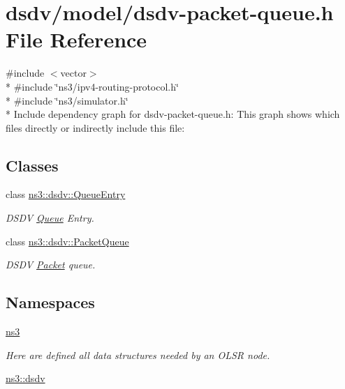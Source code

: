 \hypertarget{dsdv-packet-queue_8h}{}\section{dsdv/model/dsdv-\/packet-\/queue.h File Reference}
\label{dsdv-packet-queue_8h}
{\ttfamily \#include $<$vector$>$}\\*
{\ttfamily \#include \char`\"{}ns3/ipv4-\/routing-\/protocol.\+h\char`\"{}}\\*
{\ttfamily \#include \char`\"{}ns3/simulator.\+h\char`\"{}}\\*
Include dependency graph for dsdv-\/packet-\/queue.h\+:
This graph shows which files directly or indirectly include this file\+:
\subsection*{Classes}
\begin{DoxyCompactItemize}
\item 
class \hyperlink{classns3_1_1dsdv_1_1QueueEntry}{ns3\+::dsdv\+::\+Queue\+Entry}
\begin{DoxyCompactList}\small\item\em D\+S\+DV \hyperlink{classns3_1_1Queue}{Queue} Entry. \end{DoxyCompactList}\item 
class \hyperlink{classns3_1_1dsdv_1_1PacketQueue}{ns3\+::dsdv\+::\+Packet\+Queue}
\begin{DoxyCompactList}\small\item\em D\+S\+DV \hyperlink{classns3_1_1Packet}{Packet} queue. \end{DoxyCompactList}\end{DoxyCompactItemize}
\subsection*{Namespaces}
\begin{DoxyCompactItemize}
\item 
 \hyperlink{namespacens3}{ns3}
\begin{DoxyCompactList}\small\item\em Here are defined all data structures needed by an O\+L\+SR node. \end{DoxyCompactList}\item 
 \hyperlink{namespacens3_1_1dsdv}{ns3\+::dsdv}
\end{DoxyCompactItemize}
